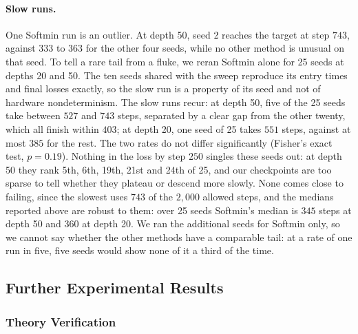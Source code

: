\documentclass{article} %
\theoremstyle{plain}
\theoremstyle{definition}
\theoremstyle{remark}
\begin{document}
\paragraph{Slow runs.} One Softmin run is an outlier. At depth 50, seed 2 reaches the target at step $743$, against
$333$ to $363$ for the other four seeds, while no other method is unusual on that seed. To tell a
rare tail from a fluke, we reran Softmin alone for 25 seeds at depths 20 and 50. The ten seeds
shared with the sweep reproduce its entry times and final losses exactly, so the slow run is a
property of its seed and not of hardware nondeterminism. The slow runs recur: at depth 50, five
of the 25 seeds take between $527$ and $743$ steps, separated by a clear gap from the other twenty,
which all finish within $403$; at depth 20, one seed of 25 takes $551$ steps, against at most
$385$ for the rest. The two rates do not differ significantly (Fisher's exact test, $p=0.19$).
Nothing in the loss by step $250$ singles these seeds out: at depth 50 they rank 5th, 6th, 19th,
21st and 24th of 25, and our checkpoints are too sparse to tell whether they plateau or descend
more slowly. None comes close to failing, since the slowest uses $743$ of the $2{,}000$ allowed
steps, and the medians reported above are robust to them: over 25 seeds Softmin's median is $345$
steps at depth 50 and $360$ at depth 20. We ran the additional seeds for Softmin only, so we cannot
say whether the other methods have a comparable tail: at a rate of one run in five, five seeds
would show none of it a third of the time.

\subsection{Further Experimental Results}
\label{apx:other-experiments}

\subsubsection{Theory Verification}
\label{apx:theory-verification}
\end{document}

